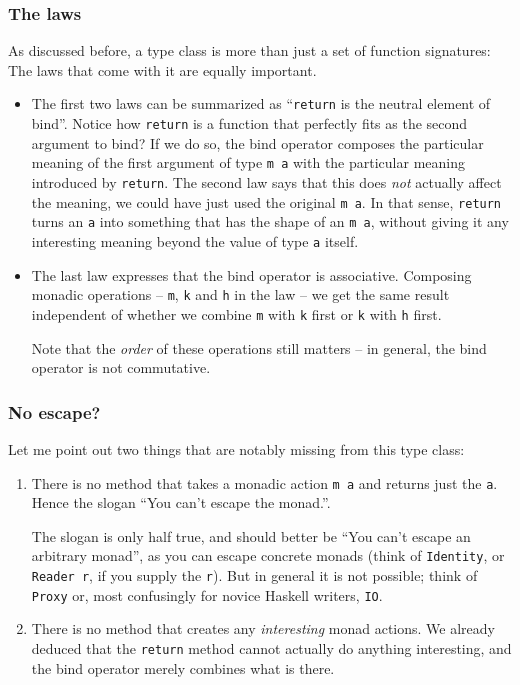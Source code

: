 \documentclass[11pt,
  american,
  DIV13]{article}
\begin{document}
\hypertarget{the-laws}{%
\subsubsection{The laws}\label{the-laws}}

As discussed before, a type class is more than just a set of function
signatures: The laws that come with it are equally important.

\begin{itemize}
\item
  The first two laws can be summarized as ``\texttt{return} is the
  neutral element of bind''. Notice how \texttt{return} is a function
  that perfectly fits as the second argument to bind? If we do so, the
  bind operator composes the particular meaning of the first argument of
  type \texttt{m\ a} with the particular meaning introduced by
  \texttt{return}. The second law says that this does \emph{not}
  actually affect the meaning, we could have just used the original
  \texttt{m\ a}. In that sense, \texttt{return} turns an \texttt{a} into
  something that has the shape of an \texttt{m\ a}, without giving it
  any interesting meaning beyond the value of type \texttt{a} itself.
\item
  The last law expresses that the bind operator is associative.
  Composing monadic operations -- \texttt{m}, \texttt{k} and \texttt{h}
  in the law -- we get the same result independent of whether we combine
  \texttt{m} with \texttt{k} first or \texttt{k} with \texttt{h} first.

  Note that the \emph{order} of these operations still matters -- in
  general, the bind operator is not commutative.
\end{itemize}

\hypertarget{no-escape}{%
\subsubsection{No escape?}\label{no-escape}}

Let me point out two things that are notably missing from this type
class:

\begin{enumerate}
\def\labelenumi{\arabic{enumi}.}
\item
  There is no method that takes a monadic action \texttt{m\ a} and
  returns just the \texttt{a}. Hence the slogan ``You can't escape the
  monad.''.

  The slogan is only half true, and should better be ``You can't escape
  an arbitrary monad'', as you can escape concrete monads (think of
  \texttt{Identity}, or \texttt{Reader\ r}, if you supply the
  \texttt{r}). But in general it is not possible; think of
  \texttt{Proxy} or, most confusingly for novice Haskell writers,
  \texttt{IO}.
\item
  There is no method that creates any \emph{interesting} monad actions.
  We already deduced that the \texttt{return} method cannot actually do
  anything interesting, and the bind operator merely combines what is
  there.
\end{enumerate}
\end{document}
